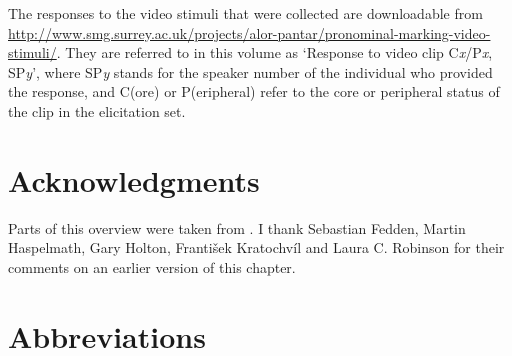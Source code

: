 The responses to the video stimuli that were collected are downloadable from \url{http://www.smg.surrey.ac.uk/projects/alor-pantar/pronominal-marking-video-stimuli/}. They are referred to in this volume as `Response to video clip C\textit{x}/P\textit{x}, SP\textit{y}', where SP\textit{y} stands for the speaker number of the individual who provided the response, and C(ore) or P(eripheral) refer to the core or peripheral status of the clip in the elicitation set. 

\section*{Acknowledgments}
Parts of this overview were taken from \citet{Klamer2010grammar,Klamer2011,BairdEtAlMs,HoltontoappearNusantara}. I thank Sebastian Fedden, Martin Haspelmath, Gary Holton, Franti\v{s}ek Kratochv\'il and Laura C. Robinson for their comments on an earlier version of this chapter.

\section*{Abbreviations}

